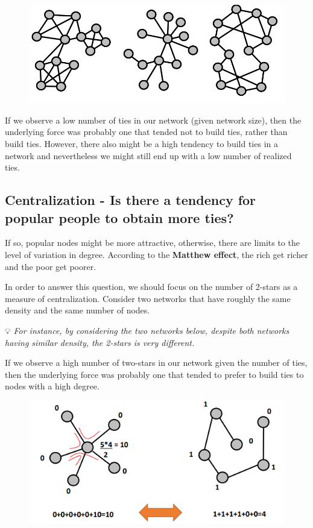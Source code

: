 \documentclass[
  notitlepage,
  onecolumn,
  openany]{book}
\begin{document}
\begin{figure}[h!]

{\centering \includegraphics[width=0.5\linewidth]{images/13-ERGMs/Untitled} 

}

\end{figure}

If we observe a low number of ties in our network (given network size), then the underlying force was probably one that tended not to build ties, rather than build ties. However, there also might be a high tendency to build ties in a network and nevertheless we might still end up with a low number of realized ties.

\hypertarget{centralization---is-there-a-tendency-for-popular-people-to-obtain-more-ties}{%
\subsection{Centralization - Is there a tendency for popular people to obtain more ties?}\label{centralization---is-there-a-tendency-for-popular-people-to-obtain-more-ties}}

If so, popular nodes might be more attractive, otherwise, there are limits to the level of variation in degree. According to the \textbf{Matthew effect}, the rich get richer and the poor get poorer.

In order to answer this question, we should focus on the number of 2-stars as a measure of centralization. Consider two networks that have roughly the same density and the same number of nodes.

💡 \emph{For instance, by considering the two networks below, despite both networks having similar density, the 2-stars is very different.}

If we observe a high number of two-stars in our network given the number of ties, then the underlying force was probably one that tended to prefer to build ties to nodes with a high degree.

\begin{figure}[h!]

{\centering \includegraphics[width=0.5\linewidth]{images/13-ERGMs/Untitled 1} 

}

\end{figure}
\end{document}
